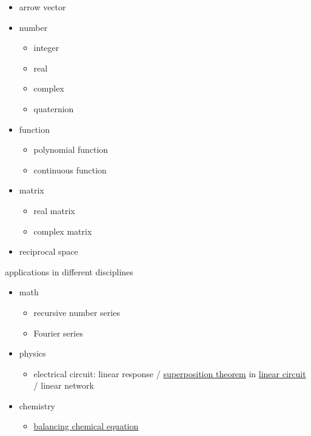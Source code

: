 \documentclass[
]{book}
\providecommand{\tightlist}{%
  \setlength{\itemsep}{0pt}\setlength{\parskip}{0pt}}
\theoremstyle{definition}
\theoremstyle{definition}
\theoremstyle{definition}
\theoremstyle{definition}
\theoremstyle{remark}
\begin{document}
\begin{itemize}
\tightlist
\item
  arrow vector
\item
  number

  \begin{itemize}
  \tightlist
  \item
    integer
  \item
    real
  \item
    complex
  \item
    quaternion
  \end{itemize}
\item
  function

  \begin{itemize}
  \tightlist
  \item
    polynomial function
  \item
    continuous function
  \end{itemize}
\item
  matrix

  \begin{itemize}
  \tightlist
  \item
    real matrix
  \item
    complex matrix
  \end{itemize}
\item
  reciprocal space
\end{itemize}

applications in different disciplines

\begin{itemize}
\tightlist
\item
  math

  \begin{itemize}
  \tightlist
  \item
    recursive number series
  \item
    Fourier series
  \end{itemize}
\item
  physics

  \begin{itemize}
  \tightlist
  \item
    electrical circuit: linear response / \href{https://en.wikipedia.org/wiki/Superposition_theorem}{superposition theorem} in \href{https://en.wikipedia.org/wiki/Linear_circuit}{linear circuit} / linear network
  \end{itemize}
\item
  chemistry

  \begin{itemize}
  \tightlist
  \item
    \href{https://en.wikipedia.org/wiki/Chemical_equation\#Balancing_chemical_equations}{balancing chemical equation}
  \end{itemize}
\end{itemize}
\end{document}
